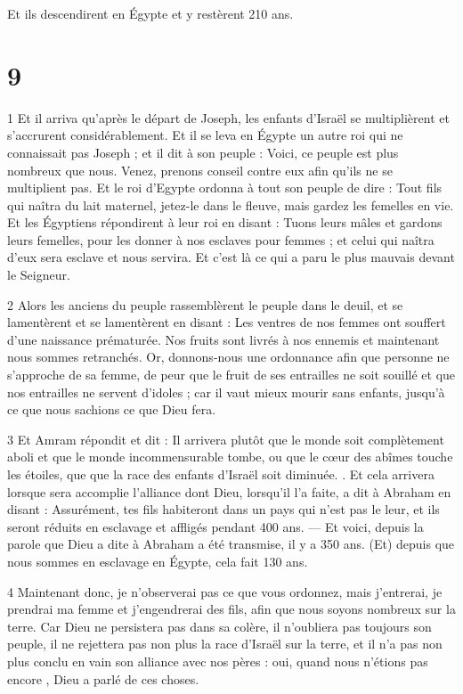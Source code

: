 \par Et ils descendirent en Égypte et y restèrent 210 ans.

\chapter{9}

\par 1 Et il arriva qu'après le départ de Joseph, les enfants d'Israël se multiplièrent et s'accrurent considérablement. Et il se leva en Égypte un autre roi qui ne connaissait pas Joseph ; et il dit à son peuple : Voici, ce peuple est plus nombreux que nous. Venez, prenons conseil contre eux afin qu'ils ne se multiplient pas. Et le roi d'Egypte ordonna à tout son peuple de dire : Tout fils qui naîtra du lait maternel, jetez-le dans le fleuve, mais gardez les femelles en vie. Et les Égyptiens répondirent à leur roi en disant : Tuons leurs mâles et gardons leurs femelles, pour les donner à nos esclaves pour femmes ; et celui qui naîtra d'eux sera esclave et nous servira. Et c’est là ce qui a paru le plus mauvais devant le Seigneur.

\par 2 Alors les anciens du peuple rassemblèrent le peuple dans le deuil, et se lamentèrent et se lamentèrent en disant : Les ventres de nos femmes ont souffert d'une naissance prématurée. Nos fruits sont livrés à nos ennemis et maintenant nous sommes retranchés. Or, donnons-nous une ordonnance afin que personne ne s'approche de sa femme, de peur que le fruit de ses entrailles ne soit souillé et que nos entrailles ne servent d'idoles ; car il vaut mieux mourir sans enfants, jusqu'à ce que nous sachions ce que Dieu fera.

\par 3 Et Amram répondit et dit : Il arrivera plutôt que le monde soit complètement aboli et que le monde incommensurable tombe, ou que le cœur des abîmes touche les étoiles, que que la race des enfants d'Israël soit diminuée. . Et cela arrivera lorsque sera accomplie l'alliance dont Dieu, lorsqu'il l'a faite, a dit à Abraham en disant : Assurément, tes fils habiteront dans un pays qui n'est pas le leur, et ils seront réduits en esclavage et affligés pendant 400 ans. — Et voici, depuis la parole que Dieu a dite à Abraham a été transmise, il y a 350 ans. (Et) depuis que nous sommes en esclavage en Égypte, cela fait 130 ans.

\par 4 Maintenant donc, je n'observerai pas ce que vous ordonnez, mais j'entrerai, je prendrai ma femme et j'engendrerai des fils, afin que nous soyons nombreux sur la terre. Car Dieu ne persistera pas dans sa colère, il n'oubliera pas toujours son peuple, il ne rejettera pas non plus la race d'Israël sur la terre, et il n'a pas non plus conclu en vain son alliance avec nos pères : oui, quand nous n'étions pas encore , Dieu a parlé de ces choses.

